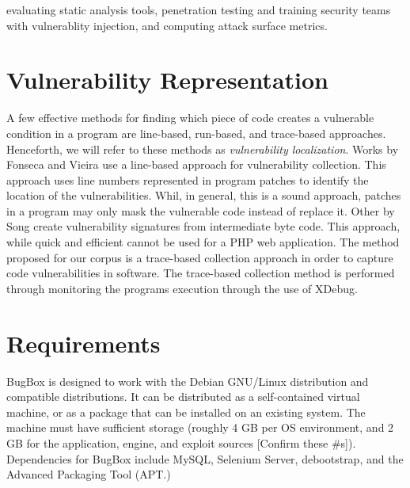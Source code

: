 \documentclass[letterpaper,twocolumn,10pt]{article}
\begin{document}
evaluating static analysis tools, penetration testing and training security teams with vulnerablity injection, and computing attack surface metrics.\\

\section{Vulnerability Representation}

A few effective methods for finding which piece of code creates a vulnerable condition in a program are line-based, run-based, and trace-based approaches.  Henceforth, we will refer to these  methods as \emph{vulnerability localization}.  Works by Fonseca and Vieira use a line-based approach for vulnerability collection.  This approach uses line numbers represented in program patches to identify the location of the vulnerabilities.  Whil, in general, this is a sound approach, patches in a program may only mask the vulnerable code instead of replace it.  Other by Song create vulnerability signatures from intermediate byte code.  This approach, while quick and efficient cannot be used for a PHP web application.  The method proposed for our corpus is a trace-based collection approach in order to capture code vulnerabilities in software.  The trace-based collection method is performed through monitoring the programs execution through the use of XDebug.

\section{Requirements}

BugBox is designed to work with the Debian GNU/Linux distribution and compatible distributions.  It can be distributed as a self-contained virtual machine, or as a package that can be installed on an existing system. The machine must have sufficient storage (roughly 4 GB per OS environment, and 2 GB for the application, engine, and exploit sources [Confirm these \#s]).  Dependencies for BugBox include MySQL,  Selenium Server, debootstrap, and the Advanced Packaging Tool (APT.)\par
\end{document}
